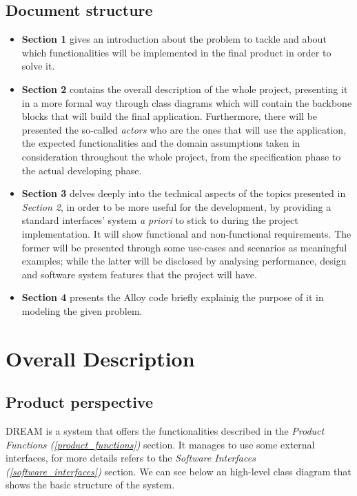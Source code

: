 \documentclass[table, 12pt]{article}
\begin{document}
\subsection{Document structure}
\begin{itemize}
    \item \textbf{Section 1} gives an introduction about the problem to tackle and about which functionalities will be implemented in the final product in order to solve it.
    \item \textbf{Section 2} contains the overall description of the whole project, presenting it in a more formal way through class diagrams which will contain the backbone blocks that will build the final application. Furthermore, there will be presented the so-called \emph{actors} who are the ones that will use the application, the expected functionalities and the domain assumptions taken in consideration throughout the whole project, from the specification phase to the actual developing phase.
    \item \textbf{Section 3} delves deeply into the technical aspects of the topics presented in \emph{Section 2}, in order to be more useful for the development, by providing a standard interfaces' system \textit{a priori} to  stick to during the project implementation. It will show functional and non-functional requirements. The former will be presented through some use-cases and scenarios as meaningful examples; while the latter will be disclosed by analysing performance, design and software system features that the project will have.
    \item \textbf{Section 4} presents the Alloy code briefly explainig the purpose of it in modeling the given problem.
\end{itemize}

\section{Overall Description}
\subsection{Product perspective}
DREAM is a system that offers the functionalities described in the \textit{Product Functions (\ref{product_functions})} section.
It manages to use some external interfaces, for more details refers to the \textit{Software Interfaces (\ref{software_interfaces})} section.
We can see below an high-level class diagram that shows the basic structure of the system.
\end{document}

